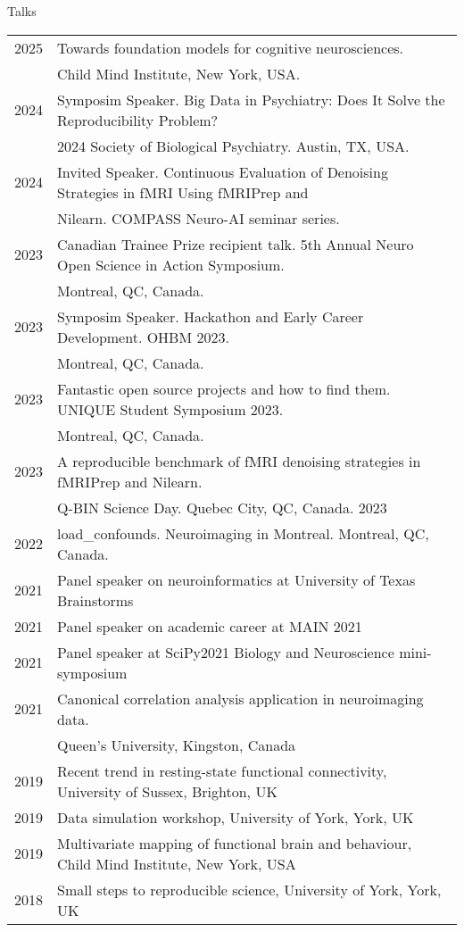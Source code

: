 \documentclass{resume} %
\begin{document}
\begin{rSection}{Talks}
  \begin{tabular}{@{} l l @{\hspace{10ex}}}
 	2025 & Towards foundation models for cognitive neurosciences. \\
 	&Child Mind Institute, New York, USA. \\
    2024 & Symposim Speaker. Big Data in Psychiatry: Does It Solve the Reproducibility Problem? \\ & 2024 Society of Biological Psychiatry. Austin, TX, USA.\\
    2024 & Invited Speaker. Continuous Evaluation of Denoising Strategies in fMRI Using fMRIPrep and\\
 	&Nilearn. COMPASS Neuro-AI seminar series.\\
    2023 & Canadian Trainee Prize recipient talk. 5th Annual Neuro Open Science in Action Symposium. \\ & Montreal, QC, Canada.\\
    2023 & Symposim Speaker. Hackathon and Early Career Development. OHBM 2023. \\&Montreal, QC, Canada.\\
    2023 & Fantastic open source projects and how to find them. UNIQUE Student Symposium 2023. \\&Montreal, QC, Canada.\\
    2023 & A reproducible benchmark of fMRI denoising strategies in fMRIPrep and Nilearn. \\ & Q-BIN Science Day. Quebec City, QC, Canada. 2023\\
   	2022 & load\_confounds. Neuroimaging in Montreal. Montreal, QC, Canada.\\
    2021 & Panel speaker on neuroinformatics at University of Texas Brainstorms\\
    2021 & Panel speaker on academic career at MAIN 2021\\
    2021 & Panel speaker at SciPy2021 Biology and Neuroscience mini-symposium\\
  	2021 & Canonical correlation analysis application in neuroimaging data. \\&Queen's University, Kingston, Canada\\
    2019 & Recent trend in resting-state functional connectivity, University of Sussex, Brighton, UK\\
    2019 & Data simulation workshop, University of York, York, UK\\
    2019 & Multivariate mapping of functional brain and behaviour, Child Mind Institute, New York, USA\\
    2018 & Small steps to reproducible science, University of York, York, UK\\
  \end{tabular}
\end{rSection}
\end{document}
